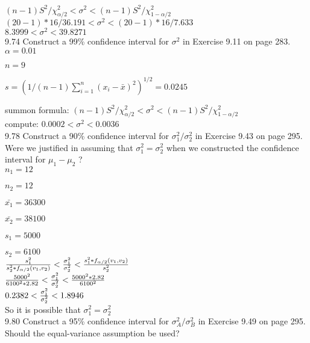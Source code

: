 $(n-1)S^2/\chi^2_{\alpha/2} < \sigma^2 < (n-1)S^2/\chi^2_{1 - \alpha/2}$ \\

$(20-1)*16/36.191 < \sigma^2 < (20-1)*16/7.633$ \\

$8.3999 < \sigma^2 < 39.8271$ \\

9.74 Construct a 99\% confidence interval for $\sigma^2$ in Exercise 9.11 on page 283. \\

$\alpha = 0.01$ 

$n = 9$ 

$s = (1/(n-1) \sum^n_{i=1} (x_i - \bar{x})^2)^{1/2}$$= 0.0245$

summon formula:
$(n-1)S^2/\chi^2_{\alpha/2} < \sigma^2 < (n-1)S^2/\chi^2_{1 - \alpha/2}$ \\

compute: $0.0002 < \sigma^2 < 0.0036$ \\


9.78 Construct a 90\% confidence interval for $\sigma^2_1 /\sigma^2_2$ in Exercise 9.43 on page 295. Were we justified in assuming that $\sigma^2_1 = \sigma^2_2 $ when we constructed the confidence interval for $\mu_1 - \mu_2$ ? \\

$n_1 = 12$

$n_2 = 12$

$\bar{x_1} = 36300$

$\bar{x_2} = 38100$

$s_1 = 5000$

$s_2 = 6100$ \\

$\frac{s_1^2}{s_2^2 * f_{\alpha/2}(v_1,v_2)} < 
\frac{\sigma_1^2}{\sigma_2^2} 
< \frac{s_1^2 * f_{\alpha/2}(v_1,v_2)}{s^2_2}$ \\

$\frac{5000^2}{6100^2 * 2.82} < 
\frac{\sigma_1^2}{\sigma_2^2} 
<\frac{5000^2* 2.82}{6100^2 }$ \\

$ 0.2382 < \frac{\sigma_1^2}{\sigma_2^2} < 1.8946 $ \\

So it is possible that $\sigma^2_1 = \sigma_2^2$ \\

9.80 Construct a 95\% confidence interval for $\sigma_A^2 / \sigma_B^2$ in Exercise 9.49 on page 295. Should the equal-variance assumption be used? \\

